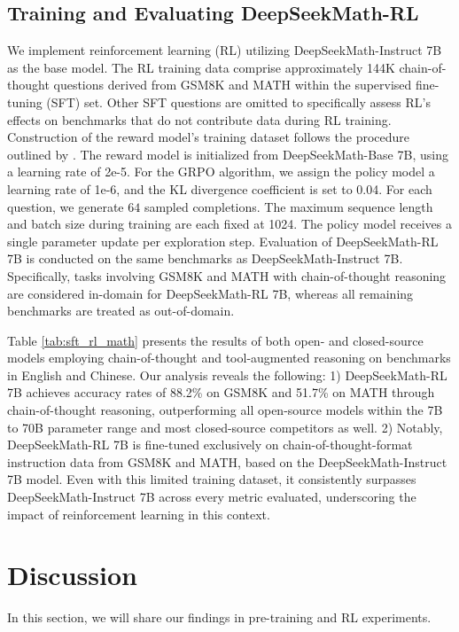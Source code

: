 \begin{itemize}[topsep=0pt]
\subsection{Training and Evaluating DeepSeekMath-RL}

We implement reinforcement learning (RL) utilizing DeepSeekMath-Instruct 7B as the base model. The RL training data comprise approximately 144K chain-of-thought questions derived from GSM8K and MATH within the supervised fine-tuning (SFT) set. Other SFT questions are omitted to specifically assess RL's effects on benchmarks that do not contribute data during RL training. Construction of the reward model's training dataset follows the procedure outlined by \citep{wang2023math}. The reward model is initialized from DeepSeekMath-Base 7B, using a learning rate of 2e-5. For the GRPO algorithm, we assign the policy model a learning rate of 1e-6, and the KL divergence coefficient is set to 0.04. For each question, we generate $64$ sampled completions. The maximum sequence length and batch size during training are each fixed at 1024. The policy model receives a single parameter update per exploration step. Evaluation of DeepSeekMath-RL 7B is conducted on the same benchmarks as DeepSeekMath-Instruct 7B. Specifically, tasks involving GSM8K and MATH with chain-of-thought reasoning are considered in-domain for DeepSeekMath-RL 7B, whereas all remaining benchmarks are treated as out-of-domain.

Table \ref{tab:sft_rl_math} presents the results of both open- and closed-source models employing chain-of-thought and tool-augmented reasoning on benchmarks in English and Chinese. Our analysis reveals the following: 1) DeepSeekMath-RL 7B achieves accuracy rates of 88.2\% on GSM8K and 51.7\% on MATH through chain-of-thought reasoning, outperforming all open-source models within the 7B to 70B parameter range and most closed-source competitors as well. 2) Notably, DeepSeekMath-RL 7B is fine-tuned exclusively on chain-of-thought-format instruction data from GSM8K and MATH, based on the DeepSeekMath-Instruct 7B model. Even with this limited training dataset, it consistently surpasses DeepSeekMath-Instruct 7B across every metric evaluated, underscoring the impact of reinforcement learning in this context.

\section{Discussion}
In this section, we will share our findings in pre-training and RL experiments. 


\end{itemize}
